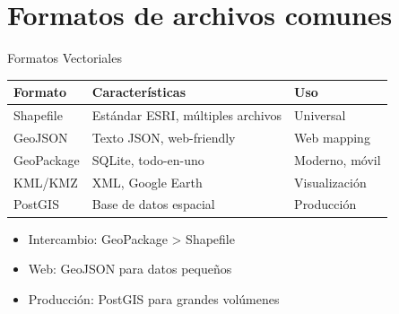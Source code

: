 \documentclass[10pt,aspectratio=169]{beamer}
\newcommand{\examplebox}[2]{
\begin{tcolorbox}[colframe=usachblue,colback=blue!5,title=#1]
#2
\end{tcolorbox}
}
\begin{document}
\section{Formatos de archivos comunes}

\begin{frame}{Formatos Vectoriales}
    \begin{center}
    \begin{table}
        \footnotesize
        \begin{tabular}{lll}
        \toprule
        \textbf{Formato} & \textbf{Características} & \textbf{Uso} \\
        \midrule
        Shapefile & Estándar ESRI, múltiples archivos & Universal \\
        GeoJSON & Texto JSON, web-friendly & Web mapping \\
        GeoPackage & SQLite, todo-en-uno & Moderno, móvil \\
        KML/KMZ & XML, Google Earth & Visualización \\
        PostGIS & Base de datos espacial & Producción \\
        \bottomrule
        \end{tabular}
    \end{table}
    \end{center}
    
    \vspace{0.3cm}
    
    \examplebox{Recomendación}{
        \footnotesize
        \begin{itemize}
            \item Intercambio: GeoPackage > Shapefile
            \item Web: GeoJSON para datos pequeños
            \item Producción: PostGIS para grandes volúmenes
        \end{itemize}
    }
\end{frame}
\end{document}
